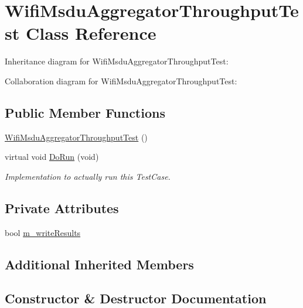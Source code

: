 \hypertarget{classWifiMsduAggregatorThroughputTest}{}\section{Wifi\+Msdu\+Aggregator\+Throughput\+Test Class Reference}
\label{classWifiMsduAggregatorThroughputTest}


Inheritance diagram for Wifi\+Msdu\+Aggregator\+Throughput\+Test\+:


Collaboration diagram for Wifi\+Msdu\+Aggregator\+Throughput\+Test\+:
\subsection*{Public Member Functions}
\begin{DoxyCompactItemize}
\item 
\hyperlink{classWifiMsduAggregatorThroughputTest_a325b61f476ea51fc33a989aac4507eb5}{Wifi\+Msdu\+Aggregator\+Throughput\+Test} ()
\item 
virtual void \hyperlink{classWifiMsduAggregatorThroughputTest_a7c7ee21528f8d3c13238b6e9455b03f4}{Do\+Run} (void)
\begin{DoxyCompactList}\small\item\em Implementation to actually run this Test\+Case. \end{DoxyCompactList}\end{DoxyCompactItemize}
\subsection*{Private Attributes}
\begin{DoxyCompactItemize}
\item 
bool \hyperlink{classWifiMsduAggregatorThroughputTest_a89cd7fa2be793060e380600808fff076}{m\+\_\+write\+Results}
\end{DoxyCompactItemize}
\subsection*{Additional Inherited Members}


\subsection{Constructor \& Destructor Documentation}
